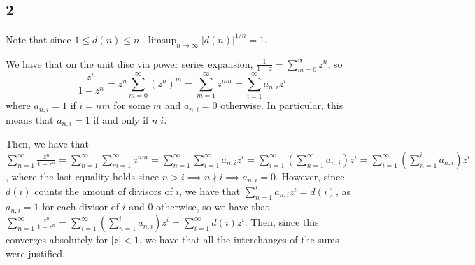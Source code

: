 \documentclass[12pt,letterpaper]{article}
\theoremstyle{definition}
\begin{document}
\subsection*{2}

Note that since $1 \leq d(n) \leq n$, $\limsup_{n \rightarrow \infty}|d(n)|^{1/n} = 1$.

We have that on the unit disc via power series expansion, $\frac{1}{1-z} = \sum_{m=0}^{\infty}z^{n}$, so
\[
  \frac{z^{n}}{1-z^{n}} = z^{n}\sum_{m=0}^{\infty}(z^{n})^{m} = \sum_{m=1}^{\infty}z^{nm} = \sum_{i=1}^{\infty}a_{n,i}z^{i}
\]
where $a_{n,i} = 1$ if $i = nm$ for some $m$ and $a_{n,i} = 0$ otherwise. In particular, this means that $a_{n,i} = 1$ if and only if $n|i$.

Then, we have that $\sum_{n=1}^{\infty}\frac{z^{n}}{1-z^{n}} = \sum_{n=1}^{\infty}\sum_{m=1}^{\infty}z^{nm} = \sum_{n=1}^{\infty}\sum_{i=1}^{\infty}a_{n,i}z^{i} = \sum_{i=1}^{\infty}(\sum_{n=1}^{\infty}a_{n,i})z^{i} = \sum_{i=1}^{\infty}(\sum_{n=1}^{i}a_{n,i})z^{i}$, where the last equality holds since $n > i \implies n \nmid i \implies a_{n,i} = 0$. However, since $d(i)$ counts the amount of divisors of $i$, we have that $\sum_{n=1}^{i}a_{n,i}z^{i} = d(i)$, as $a_{n,i} = 1$ for each divisor of $i$ and $0$ otherwise, so we have that $\sum_{n=1}^{\infty}\frac{z^{n}}{1-z^{n}} = \sum_{i=1}^{\infty}(\sum_{n=1}^{i}a_{n,i})z^{i} =  \sum_{i=1}^{\infty}d(i)z^{i}$. Then, since this converges absolutely for $|z| < 1$, we have that all the interchanges of the sums were justified.
\end{document}
